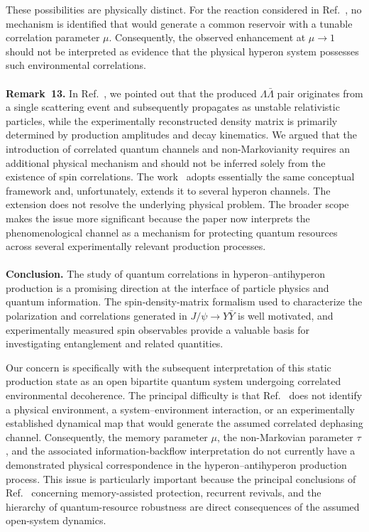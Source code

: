\documentclass[epjc,twocolumn,nofootinbib,preprintnumbers,amsmath,amssymb]{revtex4-2}
\begin{document}
These possibilities are physically distinct.
For the reaction considered in Ref.~\cite{Bachain}, no mechanism is identified that would generate a common reservoir with a tunable correlation parameter $\mu$. Consequently, the observed enhancement at $\mu\rightarrow1$ should not be interpreted as evidence that the physical hyperon system possesses such environmental correlations.
\\
\\
\textbf{Remark~13.}
In Ref.~\cite{HaddadiPRD}, we pointed out that the produced $\Lambda\bar\Lambda$ pair originates from a single scattering event and subsequently propagates as unstable relativistic particles, while the experimentally reconstructed density matrix is primarily determined by production amplitudes and decay kinematics. We argued that the introduction of correlated quantum channels and non-Markovianity requires an additional physical mechanism and should not be inferred solely from the existence of spin correlations.
The work~\cite{Bachain} adopts essentially the same conceptual framework and, unfortunately, extends it to several hyperon channels. The extension does not resolve the underlying physical problem. The broader scope makes the issue more significant because the paper now interprets the phenomenological channel as a mechanism for protecting quantum resources across several experimentally relevant production processes.
\\
\\
\textbf{Conclusion.}
The study of quantum correlations in hyperon--antihyperon production is a promising direction at the interface of particle physics and quantum information. The spin-density-matrix formalism used to characterize the polarization and correlations generated in
$
J/\psi\rightarrow Y\bar Y
$
is well motivated, and experimentally measured spin observables provide a valuable basis for investigating entanglement and related quantities.

Our concern is specifically with the subsequent interpretation of this static production state as an open bipartite quantum system undergoing correlated environmental decoherence.
The principal difficulty is that Ref.~\cite{Bachain} does not identify a physical environment, a system--environment interaction, or an experimentally established dynamical map that would generate the assumed correlated dephasing channel. Consequently, the memory parameter $\mu$, the non-Markovian parameter $\tau$, and the associated information-backflow interpretation do not currently have a demonstrated physical correspondence in the hyperon--antihyperon production process.
This issue is particularly important because the principal conclusions of Ref.~\cite{Bachain} concerning memory-assisted protection, recurrent revivals, and the hierarchy of quantum-resource robustness are direct consequences of the assumed open-system dynamics.
\end{document}
